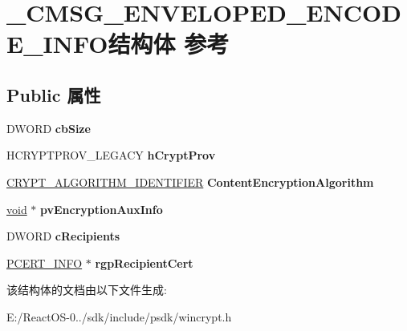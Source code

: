 \hypertarget{struct___c_m_s_g___e_n_v_e_l_o_p_e_d___e_n_c_o_d_e___i_n_f_o}{}\section{\+\_\+\+C\+M\+S\+G\+\_\+\+E\+N\+V\+E\+L\+O\+P\+E\+D\+\_\+\+E\+N\+C\+O\+D\+E\+\_\+\+I\+N\+F\+O结构体 参考}
\label{struct___c_m_s_g___e_n_v_e_l_o_p_e_d___e_n_c_o_d_e___i_n_f_o}
\subsection*{Public 属性}
\begin{DoxyCompactItemize}
\item 
\mbox{\label{struct___c_m_s_g___e_n_v_e_l_o_p_e_d___e_n_c_o_d_e___i_n_f_o_abe141dd8f7576b95320b62a504987088}} 
D\+W\+O\+RD {\bfseries cb\+Size}
\item 
\mbox{\label{struct___c_m_s_g___e_n_v_e_l_o_p_e_d___e_n_c_o_d_e___i_n_f_o_a10123cb463291bedfbd1b5fd03384981}} 
H\+C\+R\+Y\+P\+T\+P\+R\+O\+V\+\_\+\+L\+E\+G\+A\+CY {\bfseries h\+Crypt\+Prov}
\item 
\mbox{\label{struct___c_m_s_g___e_n_v_e_l_o_p_e_d___e_n_c_o_d_e___i_n_f_o_afd9ea83185865e7a8c71d66bdd0b3919}} 
\hyperlink{struct___c_r_y_p_t___a_l_g_o_r_i_t_h_m___i_d_e_n_t_i_f_i_e_r}{C\+R\+Y\+P\+T\+\_\+\+A\+L\+G\+O\+R\+I\+T\+H\+M\+\_\+\+I\+D\+E\+N\+T\+I\+F\+I\+ER} {\bfseries Content\+Encryption\+Algorithm}
\item 
\mbox{\label{struct___c_m_s_g___e_n_v_e_l_o_p_e_d___e_n_c_o_d_e___i_n_f_o_af1da0d333209f4c9fcf90c4b5c7f062e}} 
\hyperlink{interfacevoid}{void} $\ast$ {\bfseries pv\+Encryption\+Aux\+Info}
\item 
\mbox{\label{struct___c_m_s_g___e_n_v_e_l_o_p_e_d___e_n_c_o_d_e___i_n_f_o_ad71b3e24fbc86e76b9ee6ab61abfd6bb}} 
D\+W\+O\+RD {\bfseries c\+Recipients}
\item 
\mbox{\label{struct___c_m_s_g___e_n_v_e_l_o_p_e_d___e_n_c_o_d_e___i_n_f_o_a327521012746830545e17b59b4625101}} 
\hyperlink{struct___c_e_r_t___i_n_f_o}{P\+C\+E\+R\+T\+\_\+\+I\+N\+FO} $\ast$ {\bfseries rgp\+Recipient\+Cert}
\end{DoxyCompactItemize}


该结构体的文档由以下文件生成\+:\begin{DoxyCompactItemize}
\item 
E\+:/\+React\+O\+S-\/0../sdk/include/psdk/wincrypt.\+h\end{DoxyCompactItemize}
